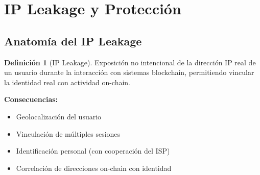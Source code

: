 \documentclass[11pt,a4paper,twoside]{book}
\theoremstyle{definition}
\newtheorem{definition}{Definición}[chapter]
\theoremstyle{remark}
\begin{document}
\section{IP Leakage y Protección}
\label{sec:ip-leakage}

\subsection{Anatomía del IP Leakage}

\begin{definition}[IP Leakage]
Exposición no intencional de la dirección IP real de un usuario durante la interacción con sistemas blockchain, permitiendo vincular la identidad real con actividad on-chain.

\textbf{Consecuencias:}
\begin{itemize}
    \item Geolocalización del usuario
    \item Vinculación de múltiples sesiones
    \item Identificación personal (con cooperación del ISP)
    \item Correlación de direcciones on-chain con identidad
\end{itemize}
\end{definition}
\end{document}
